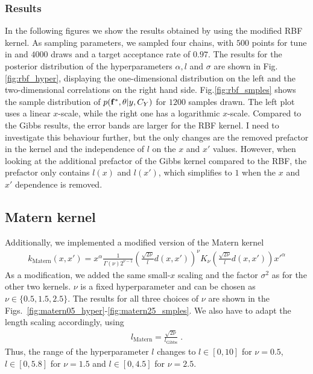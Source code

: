 \documentclass[11pt,a4paper]{article}
\begin{document}
\subsubsection{Results}

In the following figures we show the results obtained by using the modified RBF kernel. As sampling parameters, we sampled four chains, with $500$ points for tune in and $4000$ draws and a target acceptance rate of $0.97$. The results for the posterior distribution of the hyperparameters $\alpha, l$ and $\sigma$ are shown in Fig.\ref{fig:rbf_hyper}, displaying the one-dimensional distribution on the left and the two-dimensional correlations on the right hand side. 
Fig.\ref{fig:rbf_smples} shows the sample distribution of $p(\mathbf{f^*}, \theta |y, C_Y)$ for $1200$ samples drawn. The left plot uses a linear $x$-scale, while the right one has a logarithmic $x$-scale. Compared to the Gibbs results, the error bands are larger for the RBF kernel. I need to investigate this behaviour further, but the only changes are the removed prefactor in the kernel and the independence of $l$ on the $x$ and $x'$ values. However, when looking at the additional prefactor of the Gibbs kernel compared to the RBF, the prefactor only contains $l(x)$ and $l(x')$, which simplifies to $1$ when the $x$ and $x'$ dependence is removed.
%
%
%
\subsection{Matern kernel}
Additionally, we implemented a modified version of the Matern kernel
%
\begin{align}
    k_\mathrm{Matern} (x, x') = x^\alpha \frac{1}{\Gamma(\nu) 2^{\nu-1}} \left( \frac{\sqrt{2\nu}}{l} d(x, x') \right)^\nu K_\nu \left( \frac{\sqrt{2\nu}}{l} d(x, x') \right) x'^\alpha
\end{align}
%
As a modification, we added the same small-$x$ scaling and the factor $\sigma^2$ as for the other two kernels. $\nu$ is a fixed hyperparameter and can be chosen as $\nu \in \{0.5, 1.5, 2.5\}$. The results for all three choices of $\nu$ are shown in the Figs.~\ref{fig:matern05_hyper}-\ref{fig:matern25_smples}. 
We also have to adapt the length scaling accordingly, using 
%
\begin{align}
    l_\text{Matern} = \frac{\sqrt{2\nu}}{l_\text{Gibbs}} \; .
\end{align}
Thus, the range of the hyperparameter $l$ changes to $l\in [0, 10]$ for $\nu=0.5$, $l \in [0, 5.8]$ for $\nu=1.5$ and $l \in [0, 4.5]$ for $\nu=2.5$.
\end{document}
